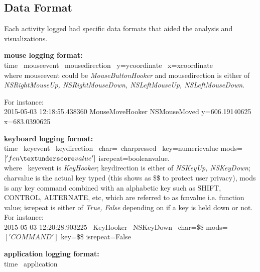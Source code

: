 \documentclass{article}
\begin{document}
\subsection{Data Format}
Each activity logged had specific data formats that aided the analysis and visualizations. 

\textbf{mouse logging format:}\\
	time 
	\textpipe \  mouse\textunderscore event  
	\textpipe  \  mouse\textunderscore direction  
	\textpipe \  y=y\textunderscore coordinate \   x=x\textunderscore coordinate\\   
	    \newline
	where mouse\textunderscore event could be \textit{MouseButtonHooker} and
	mouse\textunderscore direction is either of \textit{NSRightMouseUp, NSRightMouseDown, NSLeftMouseUp, NSLeftMouseDown}.
	
For instance: \\
2015-05-03 12:18:55.438360 
MouseMoveHooker 
NSMouseMoved 
y=606.19140625 x=683.0390625

\textbf{keyboard logging format:}\\
time
	\textpipe \  key\textunderscore event  
	\textpipe  \  key\textunderscore direction
	\textpipe \ char=\  char\textunderscore pressed \ 
    key=numeric\textunderscore value
     mods=$['fcn\textunderscore value']$
    is\textunderscore repeat=boolean\textunderscore value.\\
    \newline
    where \  key\textunderscore event is \textit{KeyHooker};  key\textunderscore direction is either of \textit{NSKeyUp, NSKeyDown}; char\textunderscore value is the actual key typed (this shows as \$\$ to protect user privacy), mods is any key command combined with an alphabetic key such as SHIFT, CONTROL, ALTERNATE, etc, which are referred to as fcn\textunderscore value i.e. function value;  is\textunderscore repeat is either of \textit{True, False} depending on if a key is held down or not.\\
    
 For instance: \\
2015-05-03 12:20:28.903225 
        \textpipe \ KeyHooker               
        \textpipe \ NSKeyDown 
        \textpipe \ char=\$\$ 
        mods=$['COMMAND']$
         key=\$\$ 
         is\textunderscore repeat=False
         
\textbf{application logging format:}\\
time \textpipe \  application  \\
\end{document}
